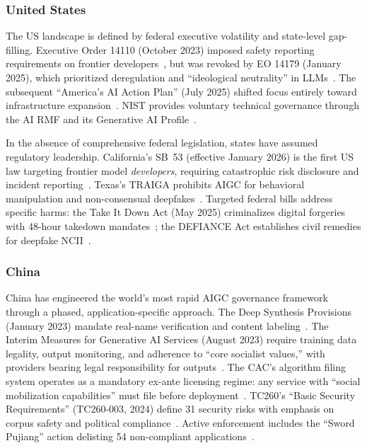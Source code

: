 \subsubsection{United States}
\label{sec:gov-us}

The US landscape is defined by federal executive volatility and state-level gap-filling. Executive Order 14110 (October 2023) imposed safety reporting requirements on frontier developers~\cite{eo14110}, but was revoked by EO 14179 (January 2025), which prioritized deregulation and ``ideological neutrality'' in LLMs~\cite{eo14179}. The subsequent ``America's AI Action Plan'' (July 2025) shifted focus entirely toward infrastructure expansion~\cite{aiactionplan2025}. NIST provides voluntary technical governance through the AI RMF and its Generative AI Profile~\cite{nistrmf,nistgenai600}.

In the absence of comprehensive federal legislation, states have assumed regulatory leadership. California's SB~53 (effective January 2026) is the first US law targeting frontier model \emph{developers}, requiring catastrophic risk disclosure and incident reporting~\cite{casb53}. Texas's TRAIGA prohibits AIGC for behavioral manipulation and non-consensual deepfakes~\cite{texastraiga}. Targeted federal bills address specific harms: the Take It Down Act (May 2025) criminalizes digital forgeries with 48-hour takedown mandates~\cite{takeitdown2025}; the DEFIANCE Act establishes civil remedies for deepfake NCII~\cite{defianceact}.


\subsubsection{China}
\label{sec:gov-china}

China has engineered the world's most rapid AIGC governance framework through a phased, application-specific approach. The Deep Synthesis Provisions (January 2023) mandate real-name verification and content labeling~\cite{chinadeepsynthesis}. The Interim Measures for Generative AI Services (August 2023) require training data legality, output monitoring, and adherence to ``core socialist values,'' with providers bearing legal responsibility for outputs~\cite{chinainterim2023}. The CAC's algorithm filing system operates as a mandatory ex-ante licensing regime: any service with ``social mobilization capabilities'' must file before deployment~\cite{chinaalgorithm}. TC260's ``Basic Security Requirements'' (TC260-003, 2024) define 31 security risks with emphasis on corpus safety and political compliance~\cite{tc260}. Active enforcement includes the ``Sword Pujiang'' action delisting 54 non-compliant applications~\cite{chinaenforcement2025}.


